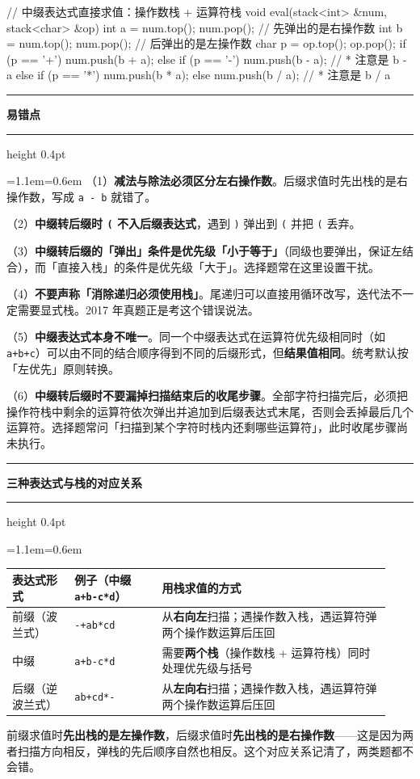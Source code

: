 \documentclass[11pt,openany,UTF8]{ctexbook}
\newcommand{\callouthead}[2]{%
  \par\addvspace{7pt}\noindent
  {\color{#1}\rule[-0.15em]{3pt}{1.05em}}\hspace{0.5em}%
  {\bfseries\color{#1}#2}\par\nobreak\vspace{-0.35em}%
  {\color{rulesep}\hrule height 0.4pt}\nobreak\vspace{0.45em}%
  \begingroup\small\setlength{\parindent}{0pt}%
  \leftskip=1.1em\rightskip=0.6em\noindent\ignorespaces}
\newcommand{\calloutend}{\par\endgroup\addvspace{7pt}}
\newenvironment{callkey}[1]{\callouthead{keybar}{#1}}{\calloutend}
\newenvironment{callwarn}[1]{\callouthead{warnbar}{#1}}{\calloutend}
\begin{document}
\begin{codebox}
// 中缀表达式直接求值：操作数栈 + 运算符栈
void eval(stack<int> &num, stack<char> &op) {
    int a = num.top(); num.pop();      // 先弹出的是右操作数
    int b = num.top(); num.pop();      // 后弹出的是左操作数
    char p = op.top(); op.pop();
    if (p == '+') num.push(b + a);
    else if (p == '-') num.push(b - a);   // * 注意是 b - a
    else if (p == '*') num.push(b * a);
    else num.push(b / a);                 // * 注意是 b / a
}
\end{codebox}

\begin{callwarn}{易错点}
（1）\textbf{减法与除法必须区分左右操作数}。后缀求值时先出栈的是右操作数，写成 \texttt{a - b} 就错了。

（2）\textbf{中缀转后缀时 \texttt{(} 不入后缀表达式}，遇到 \texttt{)\allowbreak{}} 弹出到 \texttt{(} 并把 \texttt{(} 丢弃。

（3）\textbf{中缀转后缀的「弹出」条件是优先级「小于等于」}（同级也要弹出，保证左结合），而「直接入栈」的条件是优先级「大于」。选择题常在这里设置干扰。

（4）\textbf{不要声称「消除递归必须使用栈」}。尾递归可以直接用循环改写，迭代法不一定需要显式栈。2017 年真题正是考这个错误说法。

（5）\textbf{中缀表达式本身不唯一}。同一个中缀表达式在运算符优先级相同时（如 \texttt{a+\allowbreak{}b+\allowbreak{}c}）可以由不同的结合顺序得到不同的后缀形式，但\textbf{结果值相同}。统考默认按「左优先」原则转换。

（6）\textbf{中缀转后缀时不要漏掉扫描结束后的收尾步骤}。全部字符扫描完后，必须把操作符栈中剩余的运算符依次弹出并追加到后缀表达式末尾，否则会丢掉最后几个运算符。选择题常问「扫描到某个字符时栈内还剩哪些运算符」，此时收尾步骤尚未执行。

\end{callwarn}

\begin{callkey}{三种表达式与栈的对应关系}
\begingroup\small\setlength{\tabcolsep}{4.0pt}
\begin{longtable}{@{}L{0.1552\linewidth}L{0.2187\linewidth}L{0.5546\linewidth}@{}}
\toprule
\textbf{表达式形式} & \textbf{例子（中缀 \texttt{a+\allowbreak{}b-c*d}）} & \textbf{用栈求值的方式} \\
\midrule
\endhead
前缀（波兰式） & \texttt{-+\allowbreak{}ab*cd} & 从\textbf{右向左}扫描；遇操作数入栈，遇运算符弹两个操作数运算后压回 \\
中缀 & \texttt{a+\allowbreak{}b-c*d} & 需要\textbf{两个栈}（操作数栈 + 运算符栈）同时处理优先级与括号 \\
后缀（逆波兰式） & \texttt{ab+\allowbreak{}cd*-} & 从\textbf{左向右}扫描；遇操作数入栈，遇运算符弹两个操作数运算后压回 \\
\bottomrule
\end{longtable}
\endgroup

前缀求值时\textbf{先出栈的是左操作数}，后缀求值时\textbf{先出栈的是右操作数}——这是因为两者扫描方向相反，弹栈的先后顺序自然也相反。这个对应关系记清了，两类题都不会错。

\end{callkey}
\end{document}
